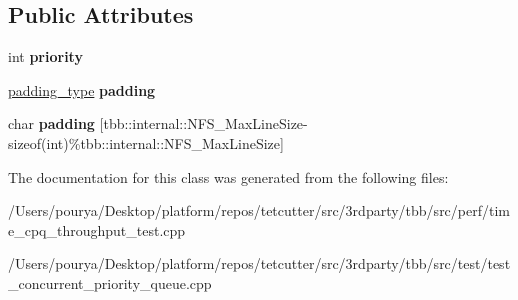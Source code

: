\subsection*{Public Attributes}
\begin{DoxyCompactItemize}
\item 
\hypertarget{classmy__data__type_afb0db657ded01e9f3856b525300d706a}{}int {\bfseries priority}\label{classmy__data__type_afb0db657ded01e9f3856b525300d706a}

\item 
\hypertarget{classmy__data__type_a4eb595c01fe9972dcd237d4e6aceacff}{}\hyperlink{classpadding__type}{padding\+\_\+type} {\bfseries padding}\label{classmy__data__type_a4eb595c01fe9972dcd237d4e6aceacff}

\item 
\hypertarget{classmy__data__type_a9a3a058703a02bfd22a9b5f9441a9084}{}char {\bfseries padding} \mbox{[}tbb\+::internal\+::\+N\+F\+S\+\_\+\+Max\+Line\+Size-\/sizeof(int)\%tbb\+::internal\+::\+N\+F\+S\+\_\+\+Max\+Line\+Size\mbox{]}\label{classmy__data__type_a9a3a058703a02bfd22a9b5f9441a9084}

\end{DoxyCompactItemize}


The documentation for this class was generated from the following files\+:\begin{DoxyCompactItemize}
\item 
/\+Users/pourya/\+Desktop/platform/repos/tetcutter/src/3rdparty/tbb/src/perf/time\+\_\+cpq\+\_\+throughput\+\_\+test.\+cpp\item 
/\+Users/pourya/\+Desktop/platform/repos/tetcutter/src/3rdparty/tbb/src/test/test\+\_\+concurrent\+\_\+priority\+\_\+queue.\+cpp\end{DoxyCompactItemize}
